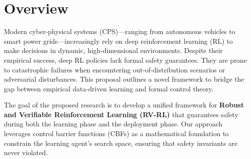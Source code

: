 \section{Overview}
Modern cyber-physical systems (CPS)---ranging from autonomous vehicles to smart power grids---increasingly rely on deep reinforcement learning (RL) to make decisions in dynamic, high-dimensional environments. Despite their empirical success, deep RL policies lack formal safety guarantees. They are prone to catastrophic failures when encountering out-of-distribution scenarios or adversarial disturbances. This proposal outlines a novel framework to bridge the gap between empirical data-driven learning and formal control theory.

The goal of the proposed research is to develop a unified framework for \textbf{Robust and Verifiable Reinforcement Learning (RV-RL)} that guarantees safety during both the learning phase and the deployment phase. Our approach leverages control barrier functions (CBFs) as a mathematical foundation to constrain the learning agent's search space, ensuring that safety invariants are never violated.
